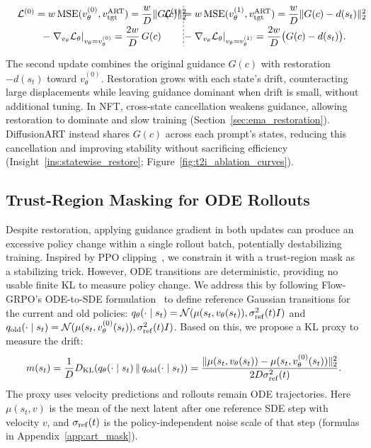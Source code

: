 \documentclass{article}
\begin{document}
\begingroup
\small
\begin{equation}
\setlength{\dashlinedash}{2pt}
\setlength{\dashlinegap}{2pt}
\setlength{\arraycolsep}{8pt}\begin{array}{@{}w{c}{0.43\linewidth}:w{c}{0.43\linewidth}@{}}
\mathcal L^{(0)}=w\operatorname{MSE}(v_\theta^{(0)},v_{\mathrm{tgt}}^{\mathrm{ART}})
=\dfrac{w}{D}\lVert G(c)\rVert_2^2
& \mathcal L^{(1)}=w\operatorname{MSE}(v_\theta^{(1)},v_{\mathrm{tgt}}^{\mathrm{ART}}) 
=\dfrac{w}{D}\lVert G(c)-d(s_t)\rVert_2^2 \\[6pt]
-\left.\nabla_{v_\theta}\mathcal L_\theta\right|_{v_\theta=v_\theta^{(0)}}
=\dfrac{2w}{D}\,G(c)
& -\left.\nabla_{v_\theta}\mathcal L_\theta\right|_{v_\theta=v_\theta^{(1)}}
=\dfrac{2w}{D}\bigl(G(c)-d(s_t)\bigr).
\end{array}
\label{eq:art_update_components}
\end{equation}
\endgroup
\par\noindent The second update combines the original guidance $G(c)$ with restoration $-d(s_t)$ toward $v_\theta^{(0)}$. Restoration grows with each state's drift, counteracting large displacements while leaving guidance dominant when drift is small, without additional tuning. In NFT, cross-state cancellation weakens guidance, allowing restoration to dominate and slow training (Section~\ref{sec:ema_restoration}). DiffusionART instead shares $G(c)$ across each prompt's states, reducing this cancellation and improving stability without sacrificing efficiency (Insight~\ref{ins:statewise_restore}; Figure~\ref{fig:t2i_ablation_curves}).

\subsection{Trust-Region Masking for ODE Rollouts}
\label{sec:art_mask}
Despite restoration, applying guidance gradient in both updates can produce an excessive policy change within a single rollout batch, potentially destabilizing training. Inspired by PPO clipping~\citep{schulman2017proximal}, we constrain it with a trust-region mask as a stabilizing trick. However, ODE transitions are deterministic, providing no usable finite KL to measure policy change. We address this by following Flow-GRPO's ODE-to-SDE formulation~\citep{liu2025flowgrpo} to define reference Gaussian transitions for the current and old policies: $q_\theta(\cdot\mid s_t)=\mathcal N(\mu(s_t,v_\theta(s_t)),\sigma_{\rm ref}^2(t)I)$ and $q_{\rm old}(\cdot\mid s_t)=\mathcal N(\mu(s_t,v_\theta^{(0)}(s_t)),\sigma_{\rm ref}^2(t)I)$. Based on this, we propose a KL proxy to measure the drift:
\begin{equation}
 m(s_t)=\frac{1}{D}D_{\rm KL}\!\left(q_\theta(\cdot\mid s_t)\,\|\,q_{\rm old}(\cdot\mid s_t)\right)
 =\frac{\|\mu(s_t,v_\theta(s_t))-\mu(s_t,v_\theta^{(0)}(s_t))\|_2^2}{2D\sigma_{\rm ref}^2(t)}.
 \label{eq:art_kl_proxy}
\end{equation}
The proxy uses velocity predictions and rollouts remain ODE trajectories. Here $\mu(s_t,v)$ is the mean of the next latent after one reference SDE step with velocity $v$, and $\sigma_{\rm ref}(t)$ is the policy-independent noise scale of that step (formulas in Appendix~\ref{app:art_mask}).
\end{document}
